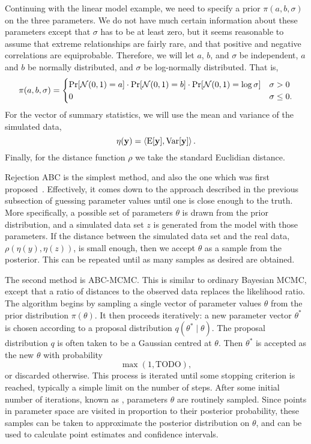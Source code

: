 Continuing with the linear model example, we need to specify a prior $\pi(a, b,
\sigma)$ on the three parameters. We do not have much certain information about
these parameters except that $\sigma$ has to be at least zero, but it seems
reasonable to assume that extreme relationships are fairly rare, and that
positive and negative correlations are equiprobable. Therefore, we will let
$a$, $b$, and $\sigma$ be independent, $a$ and $b$ be normally distributed,
and $\sigma$ be log-normally distributed. That is,
\[
  \pi(a, b, \sigma) = 
  \begin{cases}
    \Pr[\mathcal{N}(0, 1) = a] \cdot \Pr[\mathcal{N}(0, 1) = b] \cdot \Pr[\mathcal{N}(0, 1) = \log\sigma]
     & \sigma > 0 \\
    0 & \sigma \le 0.
  \end{cases}
\]
For the vector of summary statistics, we will use the mean and variance of the
simulated data,
\[
  \eta(\mathbf{y}) = \left<\operatorname{E}[\mathbf{y}], \operatorname{Var}[\mathbf{y}]\right>.
\]
Finally, for the distance function $\rho$ we take the standard Euclidian
distance.

Rejection ABC is the simplest method, and also the one which was first
proposed~\autocite{rubin1984bayesianly}. Effectively, it comes down to the
approach described in the previous subsection of guessing parameter values
until one is close enough to the truth. More specifically, a possible set of
parameters $\theta$ is drawn from the prior distribution, and a simulated data
set $z$ is generated from the model with those parameters. If the distance
between the simulated data set and the real data, $\rho(\eta(y), \eta(z))$, is
small enough, then we accept $\theta$ as a sample from the posterior. This can
be repeated until as many samples as desired are obtained.

The second method is \gls{ABC}-\gls{MCMC}. This is similar to ordinary Bayesian
\gls{MCMC}, except that a ratio of distances to the observed data replaces the
likelihood ratio. The algorithm begins by sampling a single vector of parameter
values $\theta$ from the prior distribution $\pi(\theta)$. It then proceeds
iteratively: a new parameter vector $\theta^*$ is chosen according to a
proposal distribution $q(\theta^* \mid \theta)$. The proposal distribution $q$
is often taken to be a Gaussian centred at $\theta$. Then $\theta^*$ is
accepted as the new $\theta$ with probability
\[
  \max\left(1, \text{TODO} \right),
\]
or discarded otherwise. This process is iterated until some stopping criterion
is reached, typically a simple limit on the number of steps. After some initial
number of iterations, known as , parameters $\theta$ are
routinely sampled. Since points in parameter space are visited in proportion to
their posterior probability, these samples can be taken to approximate the
posterior distribution on $\theta$, and can be used to calculate point
estimates and confidence intervals.

